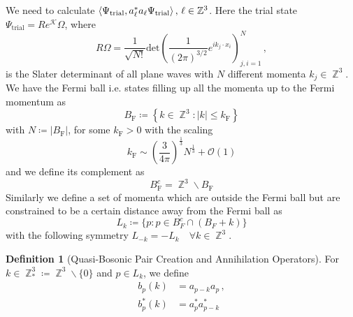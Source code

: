 \documentclass[sn-mathphys, Numbered ,a4paper]{sn-jnl}%
\DeclareMathOperator{\Z}{\mathbb{Z}}
\theoremstyle{plain}
\theoremstyle{definition}
\newtheorem{definition}[theorem]{Definition}
\theoremstyle{remark}
\theoremstyle{plain}
\theoremstyle{definition}
\theoremstyle{remark}
\begin{document}
We need to calculate $\braket{\Psi_{\mathrm{trial}},a^*_\ell a_\ell\Psi_{\mathrm{trial}}},\, \ell\in\mathbb{Z}^3$. Here the trial state $\Psi_{\mathrm{trial}}= Re^{\mathcal{K}}\Omega$, where 
\begin{equation}
    R\Omega = \frac{1}{\sqrt{N!}}\text{det}\left(\frac{1}{(2\pi)^{3/2}}e^{ik_j\cdot x_i}\right)^N_{j,i=1}\,,
\end{equation}
is the Slater determinant of all plane waves with $N$ different momenta $k_j \in \Z^3$.
We have the Fermi ball i.e. states filling up all the momenta up to the Fermi momentum as
\begin{equation}
    B_\mathrm{F}\coloneq\left\{k\in \Z^3 : |k|\leq k_\mathrm{F}\right\}
\end{equation}
with $N \coloneq |B_\mathrm{F}|$, for some $k_\mathrm{F}>0$ with the scaling 
\begin{equation}
    k_\mathrm{F}\sim \left(\frac{3}{4\pi}\right)^\frac{1}{3}N^\frac{1}{3} + \mathcal{O}(1)
\end{equation}
and we define its complement as 
\begin{equation}
    B_\mathrm{F}^c=\Z^3\backslash B_\mathrm{F}
\end{equation}
Similarly we define a set of momenta which are outside the Fermi ball but are constrained to be a certain distance away from the Fermi ball as 
\begin{equation}
    L_k\coloneq \{p :p\in B_F^c \cap (B_F + k)\}
\end{equation}
with the following symmetry $L_{-k}=-L_k \quad\forall k \in \Z^3$.
\begin{definition}[Quasi-Bosonic Pair Creation and Annihilation Operators]
    For $k\in \Z^3_* \coloneq \Z^3\backslash\{0\}$ and $p \in L_k$, we define
    \begin{align}
    b_p(k) &= a_{p-k}a_{p}\,,\\
    b^*_p(k) &= a^*_{p}a^*_{p-k}
\end{align}
\end{definition}
\end{document}
